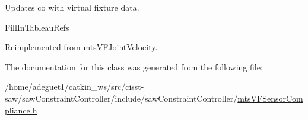 Updates co with virtual fixture data. 

Fill\-In\-Tableau\-Refs 

Reimplemented from \hyperlink{classmts_v_f_joint_velocity_ad21528da274a3c6be0339306f23e5c31}{mts\-V\-F\-Joint\-Velocity}.



The documentation for this class was generated from the following file\-:\begin{DoxyCompactItemize}
\item 
/home/adeguet1/catkin\-\_\-ws/src/cisst-\/saw/saw\-Constraint\-Controller/include/saw\-Constraint\-Controller/\hyperlink{mts_v_f_sensor_compliance_8h}{mts\-V\-F\-Sensor\-Compliance.\-h}\end{DoxyCompactItemize}
